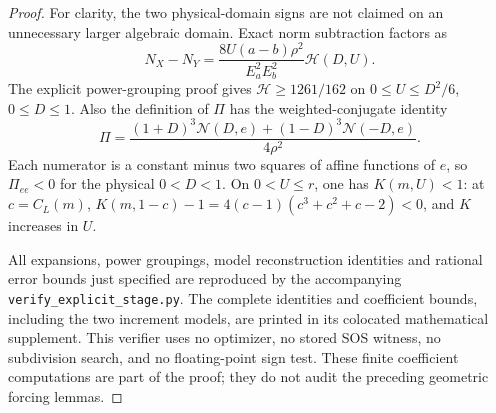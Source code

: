 \begin{proof}
For clarity, the two physical-domain signs are not claimed on an
unnecessary larger algebraic domain.  Exact norm subtraction factors as
\[
 N_X-N_Y=\frac{8U(a-b)\rho^2}{E_a^2E_b^2}\mathcal H(D,U).
\]
The explicit power-grouping proof gives
$\mathcal H\ge1261/162$ on $0\le U\le D^2/6$, $0\le D\le1$.
Also the definition of $\Pi$ has the weighted-conjugate identity
\[
 \Pi=\frac{(1+D)^3\mathcal N(D,e)+(1-D)^3\mathcal N(-D,e)}{4\rho^2}.
\]
Each numerator is a constant minus two squares of affine functions of
$e$, so $\Pi_{ee}<0$ for the physical $0<D<1$.
On $0<U\le r$, one has $K(m,U)<1$: at $c=C_L(m)$,
$K(m,1-c)-1=4(c-1)(c^3+c^2+c-2)<0$, and $K$ increases in $U$.

All expansions, power groupings, model reconstruction identities and
rational error bounds just specified are reproduced by the accompanying
\nolinkurl{verify_explicit_stage.py}.  The complete identities and
coefficient bounds, including the two increment models, are printed in
its colocated mathematical supplement.  This verifier uses no optimizer,
no stored SOS witness, no subdivision search, and no floating-point sign
test.  These finite coefficient computations are part of the proof;
they do not audit the preceding geometric forcing lemmas.
\end{proof}

